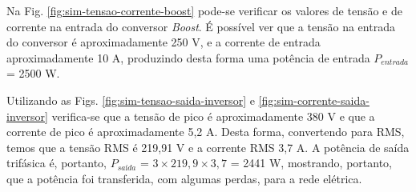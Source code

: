 Na Fig. \ref{fig:sim-tensao-corrente-boost} pode-se verificar os valores de tensão e de corrente na entrada do conversor \textit{Boost}.
É possível ver que a tensão na entrada do conversor é aproximadamente 250 V, e a corrente de entrada aproximadamente 10 A, produzindo desta forma uma potência de entrada $P_{entrada}$ = 2500 W.

Utilizando as Figs. \ref{fig:sim-tensao-saida-inversor} e \ref{fig:sim-corrente-saida-inversor} verifica-se que a tensão de pico é aproximadamente 380 V e que a corrente de pico é aproximadamente 5,2 A.
Desta forma, convertendo para RMS, temos que a tensão RMS é 219,91 V e a corrente RMS 3,7 A. A potência de saída trifásica é, portanto, $P_{saída}$ = $ 3 \times 219,9 \times 3,7$ = 2441 W, mostrando, portanto, que a potência foi transferida, com algumas perdas, para a rede elétrica.

